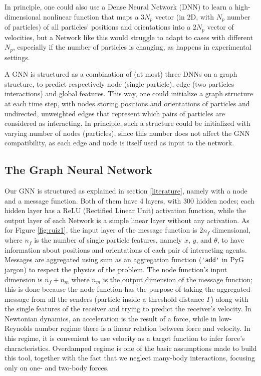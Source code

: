 \documentclass[../../master_thesis_np.tex]{subfiles}
\begin{document}
In principle, one could also use a Dense Neural Network (DNN) to learn a high-dimensional nonlinear function that maps a $3N_p$ vector (in 2D, with $N_p$ number of particles) of all particles' positions and orientations into a $2N_p$ vector of velocities, but a Network like this would struggle to adapt to cases with different $N_p$, especially if the number of particles is changing, as happens in experimental settings. 

A GNN is structured as a combination of (at most) three DNNs on a graph structure, to predict respectively node (single particle), edge (two particles interactions) and global features.
This way, one could initialize a graph structure at each time step, with nodes storing positions and orientations of particles and undirected, unweighted edges that represent which pairs of particles are considered as interacting.
In principle, such a structure could be initialized with varying number of nodes (particles), since this number does not affect the GNN compatibility, as each edge and node is itself used as input to the network.

\subsection{The Graph Neural Network}
Our GNN is structured as explained in section \ref{literature}, namely with a node and a message function. 
Both of them have 4 layers, with 300 hidden nodes; each hidden layer has a ReLU (Rectified Linear Unit) activation function, while the output layer of each Network is a simple linear layer without any activation.
As for Figure \ref{fig:ruiz1}, the input layer of the message function is $2n_f$ dimensional, where $n_f$ is the number of single particle features, namely $x$, $y$, and $\theta$, to have information about positions and orientations of each pair of interacting agents.
Messages are aggregated using sum as an aggregation function (\verb|'add'| in PyG jargon) to respect the physics of the problem.
The node function's input dimension is $n_f + n_m$ where $n_m$ is the output dimension of the message function; this is done because the node function has the purpose of taking the aggregated message from all the senders (particle inside a threshold distance $\Gamma$) along with the single features of the receiver and trying to predict the receiver's velocity.
In Newtonian dynamics, an acceleration is the result of a force, while in low-Reynolds number regime there is a linear relation between force and velocity.
In this regime, it is convenient to use velocity as a target function to infer force's characteristics.
Overdamped regime is one of the basic assumptions made to build this tool, together with the fact that we neglect many-body interactions, focusing only on one- and two-body forces.
\end{document}
